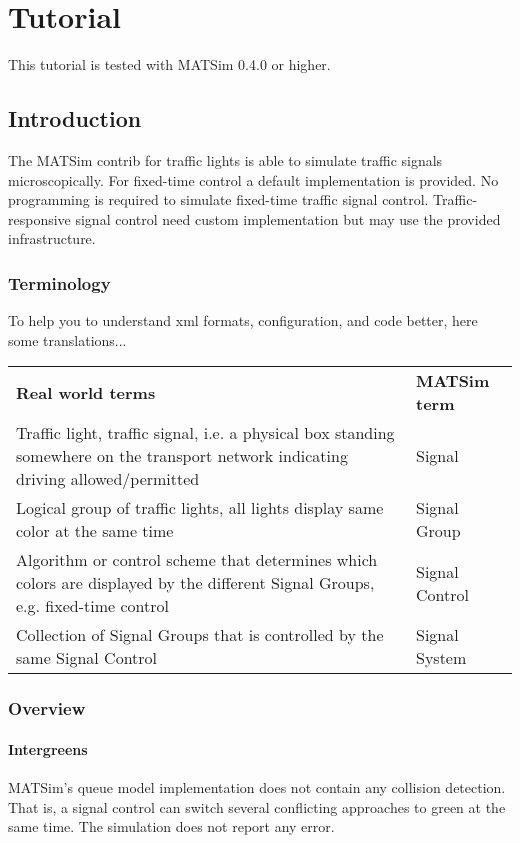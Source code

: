 \chapter{Tutorial}

This tutorial is tested with MATSim 0.4.0 or higher.

\section{Introduction}

The MATSim contrib for traffic lights is able to simulate traffic signals microscopically. 
For fixed-time control a default implementation is provided.  
No programming is required to simulate fixed-time traffic signal control. 
Traffic-responsive signal control need custom implementation but may use the provided infrastructure. 



\subsection{Terminology}

To help you to understand xml formats, configuration, and code better, here some translations...
\begin{tabular}{ll}
\textbf{Real world terms} & \textbf{MATSim term} \\ 
Traffic light, traffic signal, i.e. a physical box standing somewhere on the transport network indicating driving allowed/permitted & Signal \\ 
Logical group of traffic lights, all lights display same color at the same time & Signal Group \\ 
Algorithm or control scheme that determines which colors are displayed by the different Signal Groups, e.g. fixed-time control & Signal Control \\ 
Collection of Signal Groups that is controlled by the same Signal Control & Signal System
\end{tabular}

\subsection{Overview}

\subsubsection{Intergreens}

MATSim's queue model implementation does not contain any collision detection. 
That is, a signal control can switch several conflicting approaches to green at the same time. 
The simulation does not report any error. 


